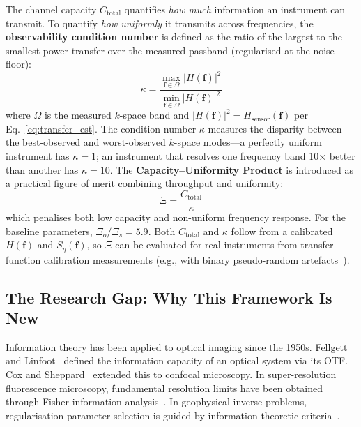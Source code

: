 \documentclass[review,12pt]{elsarticle}
\begin{document}
The channel capacity $C_\mathrm{total}$ quantifies \emph{how much} information an instrument can transmit. To quantify \emph{how uniformly} it transmits across frequencies, the \textbf{observability condition number} is defined as the ratio of the largest to the smallest power transfer over the measured passband (regularised at the noise floor):
\begin{equation}
    \kappa = \frac{\max_{\mathbf{f}\in\Omega} |H(\mathbf{f})|^2}{\min_{\mathbf{f}\in\Omega} |H(\mathbf{f})|^2}
    \label{eq:gramian}
\end{equation}
where $\Omega$ is the measured $k$-space band and $|H(\mathbf{f})|^2 = H_\mathrm{sensor}(\mathbf{f})$ per Eq.~\ref{eq:transfer_est}. The condition number $\kappa$ measures the disparity between the best-observed and worst-observed $k$-space modes---a perfectly uniform instrument has $\kappa=1$; an instrument that resolves one frequency band 10$\times$ better than another has $\kappa=10$. The \textbf{Capacity--Uniformity Product} is introduced as a practical figure of merit combining throughput and uniformity:
\begin{equation}
    \Xi = \frac{C_\mathrm{total}}{\kappa}
    \label{eq:xi}
\end{equation}
which penalises both low capacity and non-uniform frequency response. For the baseline parameters, $\Xi_o/\Xi_s = 5.9$. Both $C_\mathrm{total}$ and $\kappa$ follow from a calibrated $H(\mathbf{f})$ and $S_\eta(\mathbf{f})$, so $\Xi$ can be evaluated for real instruments from transfer-function calibration measurements (e.g., with binary pseudo-random artefacts~\cite{yashchuk2015binary}).

\subsection{The Research Gap: Why This Framework Is New}

Information theory has been applied to optical imaging since the 1950s. Fellgett~\cite{fellgett1953concerning} and Linfoot~\cite{linfoot1955information} defined the information capacity of an optical system via its OTF. Cox and Sheppard~\cite{cox1986information} extended this to confocal microscopy. In super-resolution fluorescence microscopy, fundamental resolution limits have been obtained through Fisher information analysis~\cite{ober2004fisher,ram2006framework}. In geophysical inverse problems, regularisation parameter selection is guided by information-theoretic criteria~\cite{malinverno2004adjustment}.
\end{document}
